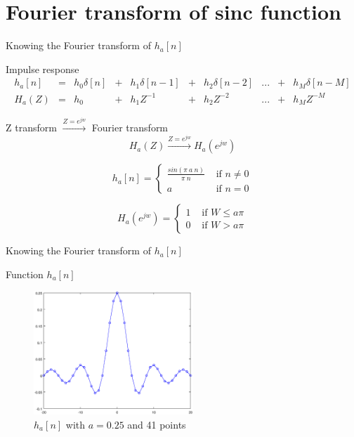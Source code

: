 \documentclass[envcountsect,dvips]{beamer}
\begin{document}
\section{Fourier transform of sinc function}
\begin{frame}{Knowing the Fourier transform of $h_a[n]$}
\begin{block}{Impulse response}
\tiny
\begin{equation}
\begin{matrix}
h_a[n] & = & h_0 \delta[n] &+& h_1\delta[n-1] &+& h_2\delta[n-2] &... &+& h_M \delta[n-M]\\
H_a(Z) & = & h_0           &+& h_1Z^{-1}      &+& h_2 Z^{-2}     &... &+& h_M Z^{-M} 
\end{matrix}
\end{equation}
\normalsize
\end{block}
\begin{block}{Z transform $\xrightarrow{ Z=e^{jw} }$ Fourier transform}
\begin{equation}
H_a(Z)  \xrightarrow{ Z=e^{jw} } H_a(e^{jw}) 
\end{equation}
\end{block}


\begin{equation}
 h_a[n]=\begin{cases}
 \frac{sin(\pi~a~n)}{\pi~n} & \text{ if } n \neq 0 \\ 
 a & \text{ if } n = 0
\end{cases}
\end{equation}

\begin{equation}
 H_a(e^{jw})=\begin{cases}
 1 & \text{ if } W \leq a \pi \\ 
 0 & \text{ if } W >    a \pi
\end{cases}
\end{equation}

\end{frame}

\begin{frame}{Knowing the Fourier transform of $h_a[n]$}
\begin{block}{Function $h_a[n]$}
\begin{figure}[!htb]
\centering
\includegraphics[width=6cm]{images/xn.eps}
\caption{$h_a[n]$ with $a=0.25$ and 41 points}
\label{fig:xn}
\end{figure}  
\end{block}
\end{frame}
\end{document}
